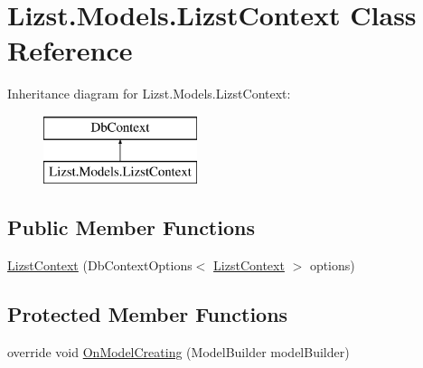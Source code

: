 \hypertarget{class_lizst_1_1_models_1_1_lizst_context}{}\section{Lizst.\+Models.\+Lizst\+Context Class Reference}
\label{class_lizst_1_1_models_1_1_lizst_context}
Inheritance diagram for Lizst.\+Models.\+Lizst\+Context\+:\begin{figure}[H]
\begin{center}
\leavevmode
\includegraphics[height=2.000000cm]{class_lizst_1_1_models_1_1_lizst_context}
\end{center}
\end{figure}
\subsection*{Public Member Functions}
\begin{DoxyCompactItemize}
\item 
\mbox{\hyperlink{class_lizst_1_1_models_1_1_lizst_context_a6c6aea6e6089842f700119337bd3818f}{Lizst\+Context}} (Db\+Context\+Options$<$ \mbox{\hyperlink{class_lizst_1_1_models_1_1_lizst_context}{Lizst\+Context}} $>$ options)
\end{DoxyCompactItemize}
\subsection*{Protected Member Functions}
\begin{DoxyCompactItemize}
\item 
override void \mbox{\hyperlink{class_lizst_1_1_models_1_1_lizst_context_af407950c77bde7bd1c59c0b38f21f9f2}{On\+Model\+Creating}} (Model\+Builder model\+Builder)
\end{DoxyCompactItemize}

